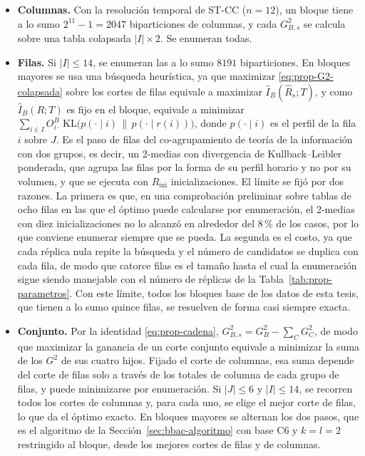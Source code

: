 \begin{itemize}
  \item \textbf{Columnas.} Con la resolución temporal de ST-CC ($n=12$), un
  bloque tiene a lo sumo $2^{11}-1 = 2047$ biparticiones de columnas, y cada
  $G^2_{B,s}$ se calcula sobre una tabla colapsada $|I|\times 2$. Se enumeran
  todas.
  \item \textbf{Filas.} Si $|I|\le 14$, se enumeran las a lo sumo $8191$
  biparticiones. En bloques mayores se usa una búsqueda heurística, ya que maximizar
  \eqref{eq:prop-G2-colapsada} sobre los cortes de filas equivale a maximizar
  $\hat I_B(\hat R_s;T)$, y como $\hat I_B(R;T)$ es fijo en el bloque, equivale
  a minimizar
  $\sum_{i\in I} O^B_{i\cdot}\,\mathrm{KL}\bigl(p(\cdot\mid i)\,\|\,p(\cdot\mid r(i))\bigr)$,
  donde $p(\cdot\mid i)$ es el perfil de la fila $i$ sobre $J$. Es el paso de
  filas del co-agrupamiento de teoría de la información \cite{Dhillon2003}
  con dos grupos, es decir, un 2-medias con divergencia de Kullback--Leibler
  ponderada, que agrupa las filas por la forma de su perfil horario y no por su
  volumen, y que se ejecuta con $R_{\mathrm{ini}}$ inicializaciones. El límite
  se fijó por dos razones. La primera es que, en una comprobación preliminar sobre
  tablas de ocho filas en las que el óptimo puede calcularse por enumeración, el
  2-medias con diez inicializaciones no lo alcanzó en alrededor del 8\,\% de los
  casos, por lo que conviene enumerar siempre que se pueda. La segunda es el
  costo, ya que cada réplica nula repite la búsqueda y el número de candidatos se
  duplica con cada fila, de modo que catorce filas es el tamaño hasta el cual la
  enumeración sigue siendo manejable con el número de réplicas de la
  Tabla~\ref{tab:prop-parametros}. Con este límite, todos los bloques base de los
  datos de esta tesis, que tienen a lo sumo quince filas, se resuelven de forma
  casi siempre exacta.
  \item \textbf{Conjunto.} Por la identidad \eqref{eq:prop-cadena},
  $G^2_{B,s} = G^2_B - \sum_{C} G^2_C$, de modo que maximizar la ganancia de
  un corte conjunto equivale a minimizar la suma de los $G^2$ de sus cuatro
  hijos. Fijado el corte de columnas, esa suma depende del corte de filas solo
  a través de los totales de columna de cada grupo de filas, y puede
  minimizarse por enumeración. Si $|J|\le 6$ y $|I|\le 14$, se recorren todos
  los cortes de columnas y, para cada uno, se elige el mejor corte de filas, lo
  que da el óptimo exacto. En bloques mayores se alternan los dos pasos, que es
  el algoritmo de la Sección~\ref{sec:bbac-algoritmo} con base C6 y $k=l=2$
  restringido al bloque, desde los mejores cortes de filas y de columnas.
\end{itemize}

